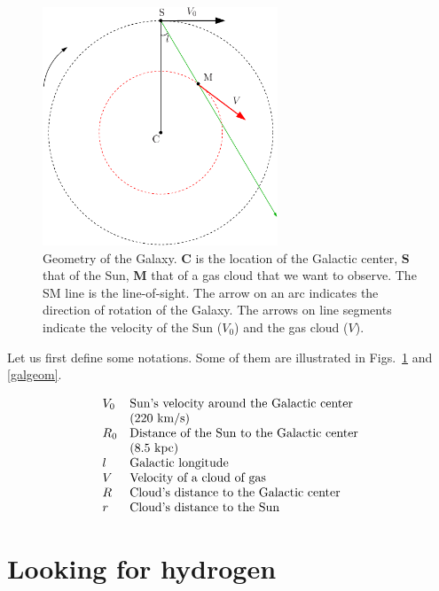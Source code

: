 \begin{figure}[ht]
\begin{center}
\includegraphics[width=7cm]{../figures/suncloud.pdf}
\end{center}
\caption{Geometry of the Galaxy. {\bf C} is the location of the Galactic center, 
{\bf S} that of the Sun, {\bf M} that of a gas cloud that we want to observe. 
The SM line is the line-of-sight. The arrow on an arc indicates the direction 
of rotation of the Galaxy. The arrows on line segments indicate the
velocity of the Sun ($V_0$) and the gas cloud ($V$).}
\label{figgeom}
\end{figure}  

Let us first define some notations. 
Some of them are illustrated in Figs.~\ref{figgeom} and \ref{galgeom}.

\begin{displaymath}
\begin{array}{ll}
V_0 	&\hbox{Sun's velocity around the Galactic center} 	\\
        & (220 \hbox{ km/s})					\\
R_0	&\hbox{Distance of the Sun to the Galactic center} 	\\
        & (8.5 \hbox{ kpc}) 					\\
l	&\hbox{Galactic longitude}				\\
V	&\hbox{Velocity of a cloud of gas}			\\
R	&\hbox{Cloud's distance to the Galactic center}		\\
r	&\hbox{Cloud's distance to the Sun}
\end{array}
\end{displaymath}


\section{Looking for hydrogen}


